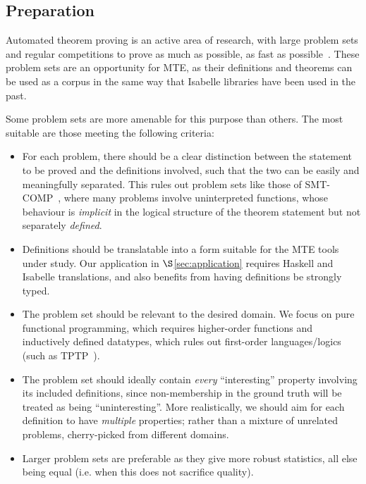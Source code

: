 \subsection{Preparation}
\label{section:prep}

Automated theorem proving is an active area of research, with large problem sets
and regular competitions to prove as much as possible, as fast as
possible~\cite{pelletier2002development}. These problem sets are an opportunity
for MTE, as their definitions and theorems can be used as a corpus in the same
way that Isabelle libraries have been used in the past.

Some problem sets are more amenable for this purpose than others. The most
suitable are those meeting the following criteria:

\begin{itemize}
\item For each problem, there should be a clear distinction between the
  statement to be proved and the definitions involved, such that the two can be
  easily and meaningfully separated. This rules out problem sets like those of
  SMT-COMP~\cite{barrett2005smt}, where many problems involve uninterpreted
  functions, whose behaviour is \emph{implicit} in the logical structure of the
  theorem statement but not separately \emph{defined}.
\item Definitions should be translatable into a form suitable for the MTE tools
  under study. Our application in $\S$\ref{sec:application} requires Haskell and
  Isabelle translations, and also benefits from having definitions be strongly
  typed.
\item The problem set should be relevant to the desired domain. We focus on pure
  functional programming, which requires higher-order functions and inductively
  defined datatypes, which rules out first-order languages/logics (such as
  TPTP~\cite{sutcliffe2009tptp}).
\item The problem set should ideally contain \emph{every} ``interesting''
  property involving its included definitions, since non-membership in the
  ground truth will be treated as being ``uninteresting''. More realistically,
  we should aim for each definition to have \emph{multiple} properties; rather
  than a mixture of unrelated problems, cherry-picked from different domains.
\item Larger problem sets are preferable as they give more robust statistics, all
  else being equal (i.e. when this does not sacrifice quality).
\end{itemize}

